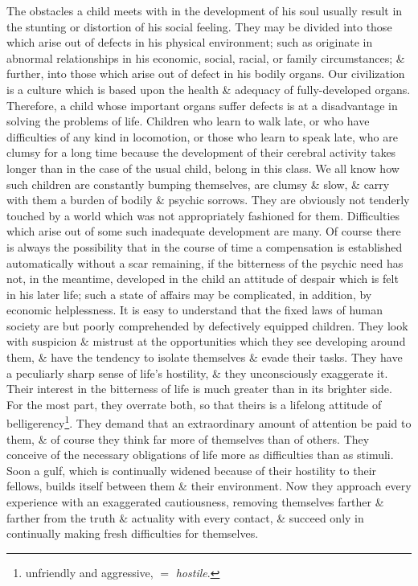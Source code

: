 \documentclass{article}
\begin{document}
The obstacles a child meets with in the development of his soul usually result in the stunting or distortion of his social feeling. They may be divided into those which arise out of defects in his physical environment; such as originate in abnormal relationships in his economic, social, racial, or family circumstances; \& further, into those which arise out of defect in his bodily organs. Our civilization is a culture which is based upon the health \& adequacy of fully-developed organs. Therefore, a child whose important organs suffer defects is at a disadvantage in solving the problems of life. Children who learn to walk late, or who have difficulties of any kind in locomotion, or those who learn to speak late, who are clumsy for a long time because the development of their cerebral activity takes longer than in the case of the usual child, belong in this class. We all know how such children are constantly bumping themselves, are clumsy \& slow, \& carry with them a burden of bodily \& psychic sorrows. They are obviously not tenderly touched by a world which was not appropriately fashioned for them. Difficulties which arise out of some such inadequate development are many. Of course there is always the possibility that in the course of time a compensation is established automatically without a scar remaining, if the bitterness of the psychic need has not, in the meantime, developed in the child an attitude of despair which is felt in his later life; such a state of affairs may be complicated, in addition, by economic helplessness. It is easy to understand that the fixed laws of human society are but poorly comprehended by defectively equipped children. They look with suspicion \& mistrust at the opportunities which they see developing around them, \& have the tendency to isolate themselves \& evade their tasks. They have a peculiarly sharp sense of life's hostility, \& they unconsciously exaggerate it. Their interest in the bitterness of life is much greater than in its brighter side. For the most part, they overrate both, so that theirs is a lifelong attitude of belligerency\footnote{unfriendly and aggressive, $=$ {\it hostile}.}. They demand that an extraordinary amount of attention be paid to them, \& of course they think far more of themselves than of others. They conceive of the necessary obligations of life more as difficulties than as stimuli. Soon a gulf, which is continually widened because of their hostility to their fellows, builds itself between them \& their environment. Now they approach every experience with an exaggerated cautiousness, removing themselves farther \& farther from the truth \& actuality with every contact, \& succeed only in continually making fresh difficulties for themselves.
\end{document}
